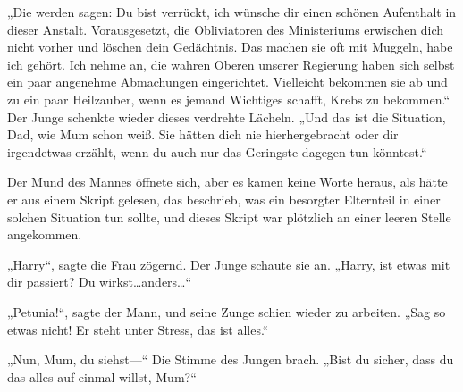 „Die werden sagen: Du bist verrückt, ich wünsche dir einen schönen Aufenthalt in dieser Anstalt. Vorausgesetzt, die Obliviatoren des Ministeriums erwischen dich nicht vorher und löschen dein Gedächtnis. Das machen sie oft mit Muggeln, habe ich gehört. Ich nehme an, die wahren Oberen unserer Regierung haben sich selbst ein paar angenehme Abmachungen eingerichtet. Vielleicht bekommen sie ab und zu ein paar Heilzauber, wenn es jemand Wichtiges schafft, Krebs zu bekommen.“ Der Junge schenkte wieder dieses verdrehte Lächeln. „Und das ist die Situation, Dad, wie Mum schon weiß. Sie hätten dich nie hierhergebracht oder dir irgendetwas erzählt, wenn du auch nur das Geringste dagegen tun könntest.“

Der Mund des Mannes öffnete sich, aber es kamen keine Worte heraus, als hätte er aus einem Skript gelesen, das beschrieb, was ein besorgter Elternteil in einer solchen Situation tun sollte, und dieses Skript war plötzlich an einer leeren Stelle angekommen.



„Harry“, sagte die Frau zögernd. Der Junge schaute sie an. „Harry, ist etwas mit dir passiert? Du wirkst…anders…“

„Petunia!“, sagte der Mann, und seine Zunge schien wieder zu arbeiten. „Sag so etwas nicht! Er steht unter Stress, das ist alles.“

„Nun, Mum, du siehst—“ Die Stimme des Jungen brach. „Bist du sicher, dass du das alles auf einmal willst, Mum?“

